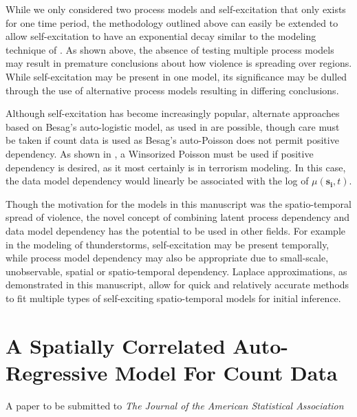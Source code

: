 \documentclass[11pt]{isuthesis}
\begin{document}
While we only considered two process models and self-excitation that only exists for one time period, the methodology outlined above can easily be extended to allow self-excitation to have an exponential decay similar to the modeling technique of \cite{mohler2011self}.  As shown above, the absence of testing multiple process models may result in premature conclusions about how violence is spreading over regions.  While self-excitation may be present in one model, its significance may be dulled through the use of alternative process models resulting in differing conclusions.

Although self-excitation has become increasingly popular, alternate approaches based on Besag's auto-logistic model, as used in \cite{weidmann2010predicting} are possible, though care must be taken if count data is used as Besag's auto-Poisson does not permit positive dependency. As shown in \cite{kaiser1997modeling}, a Winsorized Poisson must be used if positive dependency is desired, as it most certainly is in terrorism modeling.  In this case, the data model dependency would linearly be associated with the log of $\mu(\boldsymbol{s_i},t)$.

Though the motivation for the models in this manuscript was the spatio-temporal spread of violence, the novel concept of combining latent process dependency and data model dependency has the potential to be used in other fields.  For example in the modeling of thunderstorms, self-excitation may be present temporally, while process model dependency may also be appropriate due to small-scale, unobservable, spatial or spatio-temporal dependency.  Laplace approximations, as demonstrated in this manuscript, allow for quick and relatively accurate methods to fit multiple types of self-exciting spatio-temporal models for initial inference. 
\chapter{A Spatially Correlated Auto-Regressive Model For Count Data}\label{JASA}
\begin{center}
	A paper to be submitted to \textit{The Journal of the American Statistical Association}
\end{center}
\end{document}
